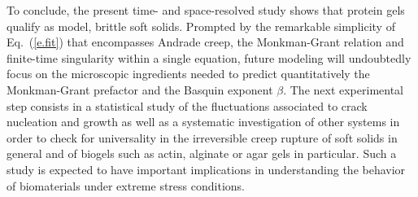 \documentclass[twocolumn,superscriptaddress,showpacs,preprintnumbers,amsmath,amssymb,prl]{revtex4}
\begin{document}
To conclude, the present time- and space-resolved study shows that protein gels qualify as model, brittle soft solids. Prompted by the remarkable simplicity of Eq.~(\ref{e.fit}) that encompasses Andrade creep, the Monkman-Grant relation and finite-time singularity within a single equation, future modeling will undoubtedly focus on the microscopic ingredients needed to predict quantitatively the Monkman-Grant prefactor and the Basquin exponent $\beta$. The next experimental step consists in a statistical study of the fluctuations associated to crack nucleation and growth as well as a systematic investigation of other systems in order to check for universality in the irreversible creep rupture of soft solids in general and of biogels such as actin, alginate or agar gels in particular. Such a study is expected to have important implications in understanding the behavior of biomaterials under extreme stress conditions.




\end{document}
